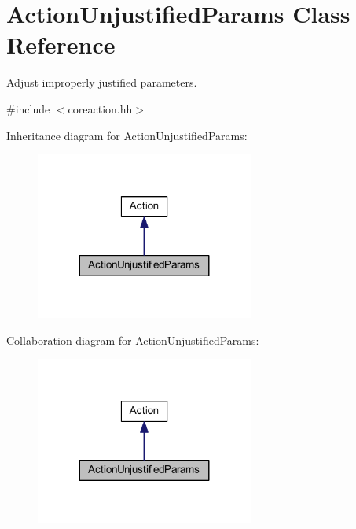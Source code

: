 \hypertarget{class_action_unjustified_params}{}\section{Action\+Unjustified\+Params Class Reference}
\label{class_action_unjustified_params}


Adjust improperly justified parameters.  




{\ttfamily \#include $<$coreaction.\+hh$>$}



Inheritance diagram for Action\+Unjustified\+Params\+:
\nopagebreak
\begin{figure}[H]
\begin{center}
\leavevmode
\includegraphics[width=203pt]{class_action_unjustified_params__inherit__graph}
\end{center}
\end{figure}


Collaboration diagram for Action\+Unjustified\+Params\+:
\nopagebreak
\begin{figure}[H]
\begin{center}
\leavevmode
\includegraphics[width=203pt]{class_action_unjustified_params__coll__graph}
\end{center}
\end{figure}
